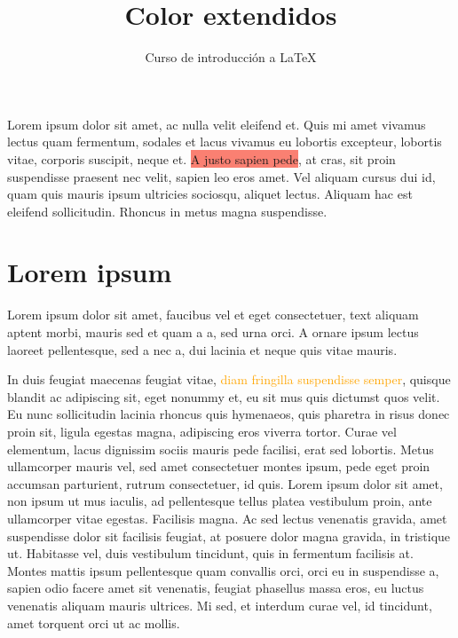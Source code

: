 \documentclass[10pt,letterpaper]{article}
\title{\color{Blue} Color extendidos}
\author{Curso de introducción a LaTeX}
\begin{document}
\maketitle
\textcolor{OliveGreen}{Lorem ipsum dolor sit amet, ac nulla velit eleifend et}. Quis mi amet vivamus lectus quam fermentum, sodales et lacus vivamus eu lobortis excepteur, lobortis vitae, corporis suscipit, neque et. \colorbox{Salmon}{A justo sapien pede}, at cras, sit proin suspendisse praesent nec velit, sapien leo eros amet. Vel aliquam cursus dui id, quam quis mauris ipsum ultricies sociosqu, aliquet lectus. Aliquam hac est eleifend sollicitudin. Rhoncus in metus magna suspendisse.
 
\section{\color{Maroon}Lorem ipsum}
Lorem ipsum dolor sit amet, faucibus vel et eget consectetuer, text aliquam aptent morbi, mauris sed et quam a a, sed urna orci. A ornare ipsum lectus laoreet pellentesque, sed a nec a, dui lacinia et neque quis vitae mauris. 

In duis feugiat maecenas feugiat vitae, \textcolor{Orange}{diam fringilla suspendisse semper}, quisque blandit ac adipiscing sit, eget nonummy et, eu sit mus quis dictumst quos velit. Eu nunc sollicitudin lacinia rhoncus quis hymenaeos, quis pharetra in risus donec proin sit, ligula egestas magna, adipiscing eros viverra tortor. Curae vel elementum, lacus dignissim sociis mauris pede facilisi, erat sed lobortis. Metus ullamcorper mauris vel, sed amet consectetuer montes ipsum, pede eget proin accumsan parturient, rutrum consectetuer, id quis. 
\newpage
\pagecolor{GreenYellow}
Lorem ipsum dolor sit amet, non ipsum ut mus iaculis, ad pellentesque tellus platea vestibulum proin, ante ullamcorper vitae egestas. Facilisis magna. Ac sed lectus venenatis gravida, amet suspendisse dolor sit facilisis feugiat, at posuere dolor magna gravida, in tristique ut. Habitasse vel, duis vestibulum tincidunt, quis in fermentum facilisis at. Montes mattis ipsum pellentesque quam convallis orci, orci eu in suspendisse a, sapien odio facere amet sit venenatis, feugiat phasellus massa eros, eu luctus venenatis aliquam mauris ultrices. Mi sed, et interdum curae vel, id tincidunt, amet torquent orci ut ac mollis. 
\end{document}
